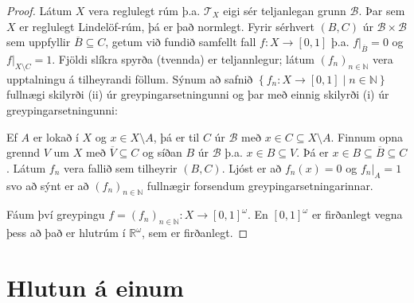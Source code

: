 \documentclass[a4paper,icelandic]{book}
\theoremstyle{definition}
\theoremstyle{plain}
\theoremstyle{remark}
\newcommand{\R}{\mathbb{R}} %
\newcommand{\N}{\mathbb{N}} %
\begin{document}
\begin{proof}
  Látum $X$ vera reglulegt rúm þ.a. $\mathcal T_X$ eigi sér teljanlegan
  grunn $\mathcal B$. Þar sem $X$ er reglulegt Lindelöf-rúm, þá er það
  normlegt. Fyrir sérhvert $(B,C)$ úr $\mathcal B\times\mathcal B$ sem
  uppfyllir $\overline{B}\subseteq C$, getum við fundið
  samfellt fall $f: X\to\left[ 0,1 \right]$ þ.a. $f|_{\overline B}=0$ og
  $f|_{X\setminus C} = 1$. Fjöldi slíkra spyrða (tvennda) er
  teljannlegur; látum $(f_n)_{n\in\N}$ vera upptalningu á tilheyrandi
  föllum. Sýnum að safnið $\left\{ f_n:X\to [0,1]\mid n\in\N \right\}$
  fullnægi skilyrði (ii) úr greypingarsetningunni og þar með einnig
  skilyrði (i) úr greypingarsetningunni:

  Ef $A$ er lokað í $X$ og $x\in X\setminus A$, þá er til $C$ úr
  $\mathcal B$ með $x\in C\subseteq X\setminus A$. Finnum opna grennd
  $V$ um $X$ með $\overline V\subseteq C$ og síðan $B$ úr $\mathcal B$
  þ.a. $x\in B\subseteq V$. Þá er $x\in B\subseteq\overline B\subseteq
  C$. Látum $f_n$ vera fallið sem tilheyrir $(B,C)$. Ljóst er að $f_n(x)
  = 0$ og $f_n |_A = 1$ svo að sýnt er að $(f_n)_{n\in\N}$ fullnægir
  forsendum greypingarsetningarinnar.

  Fáum því greypingu $f=(f_n)_{n\in\N}: X\to [0,1]^\omega$. En
  $[0,1]^\omega$ er firðanlegt vegna þess að það er hlutrúm í
  $\R^\omega$, sem er firðanlegt.
\end{proof}

\section{Hlutun á einum}
\end{document}
